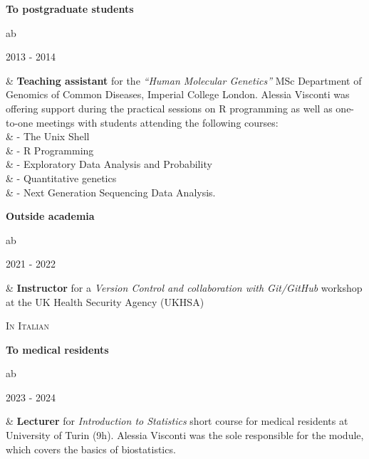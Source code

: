 \documentclass[a4paper,10pt]{article}
\newcommand{\smalltitle}[1]{
	\vspace{0.1cm}
	{\noindent 
	\large \textsc{#1}}
	\vspace{0.1cm}
}
\newenvironment{singletablelist}
{	\vspace{-0.2cm}
	\begin{longtable}[!h]{ab}}{\end{longtable}
}
\newcommand{\stlist}[2]{
	\hspace{-3cm}
	\noindent
	\begin{minipage}{0.24\textwidth}
	\begin{flushright}
	\textsc{#1}
	\end{flushright}
	\end{minipage}
	& #2\\[0.2cm]
}
\begin{document}
\vspace{0.2cm}

\noindent \textbf{To postgraduate students}

\begin{singletablelist}

	\stlist{2013 - 2014}{\textbf{Teaching assistant} for the \emph{``Human Molecular Genetics''} MSc Department of Genomics of Common Diseases, Imperial College London. Alessia Visconti was offering support during the practical sessions on R programming as well as one-to-one meetings with students attending the following courses:\\
							& \hskip1cm - The Unix Shell\\
							& \hskip1cm - R Programming\\
							& \hskip1cm - Exploratory Data Analysis and Probability\\
							& \hskip1cm - Quantitative genetics\\
							& \hskip1cm - Next Generation Sequencing Data Analysis.}				
\end{singletablelist}							

\vspace{0.2cm}


\noindent \textbf{Outside academia}


\begin{singletablelist}


\stlist{2021 - 2022}{ \textbf{Instructor} for a \emph{Version Control and collaboration with Git/GitHub} workshop at the UK Health Security Agency (UKHSA)}

\end{singletablelist}


\smalltitle{In Italian}

\vspace{0.2cm}

\noindent \textbf{To medical residents}

\begin{singletablelist}
	\stlist{2023 - 2024}{\textbf{Lecturer} for \emph{Introduction to Statistics} short course for medical residents at University of Turin (9h). Alessia Visconti was the sole responsible for the module, which covers the basics of biostatistics.}
\end{singletablelist}

\vspace{0.2cm}
\end{document}
